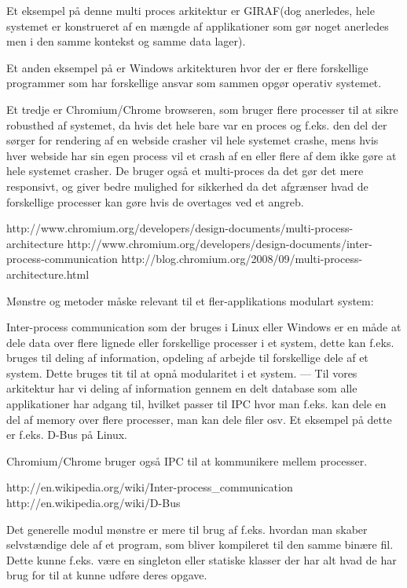 Et eksempel på denne multi proces arkitektur er GIRAF(dog anerledes, hele systemet er konstrueret af en mængde af applikationer som gør noget anerledes men i den samme kontekst og samme data lager). 

Et anden eksempel på er Windows arkitekturen hvor der er flere forskellige programmer som har forskellige ansvar som sammen opgør operativ systemet. 

Et tredje er Chromium/Chrome browseren, som bruger flere processer til at sikre robusthed af systemet, da hvis det hele bare var en proces og f.eks. den del der sørger for rendering af en webside crasher vil hele systemet crashe, mens hvis hver webside har sin egen process vil et crash af en eller flere af dem ikke gøre at hele systemet crasher. De bruger også et multi-proces da det gør det mere responsivt, og giver bedre mulighed for sikkerhed da det afgrænser hvad de forskellige processer kan gøre hvis de overtages ved et angreb.

http://www.chromium.org/developers/design-documents/multi-process-architecture
http://www.chromium.org/developers/design-documents/inter-process-communication
http://blog.chromium.org/2008/09/multi-process-architecture.html

Mønstre og metoder måske relevant til et fler-applikations modulart system:

Inter-process communication som der bruges i Linux eller Windows er en måde at dele data over flere lignede eller forskellige processer i et system, dette kan f.eks. bruges til deling af information, opdeling af arbejde til forskellige dele af et system. Dette bruges tit til at opnå modularitet i et system. --- Til vores arkitektur har vi deling af information gennem en delt database som alle applikationer har adgang til, hvilket passer til IPC hvor man f.eks. kan dele en del af memory over flere processer, man kan dele filer osv. Et eksempel på dette er f.eks. D-Bus på Linux.

Chromium/Chrome bruger også IPC til at kommunikere mellem processer.

http://en.wikipedia.org/wiki/Inter-process_communication
http://en.wikipedia.org/wiki/D-Bus

Det generelle modul mønstre er mere til brug af f.eks. hvordan man skaber selvstændige dele af et program, som bliver kompileret til den samme binære fil. Dette kunne f.eks. være en singleton eller statiske klasser der har alt hvad de har brug for til at kunne udføre deres opgave. 
